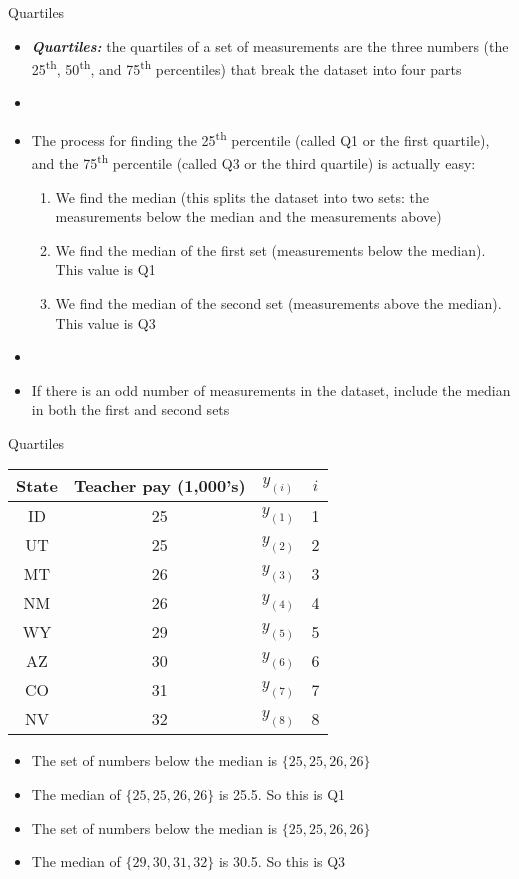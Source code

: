 \documentclass[xcolor=dvipsnames]{beamer}
\begin{document}
\begin{frame}{Quartiles}
	\begin{itemize}
		\item \textbf{\emph{Quartiles:}} the quartiles of a set of measurements are the three numbers (the 25\textsuperscript{th}, 50\textsuperscript{th}, and 75\textsuperscript{th} percentiles) that break the dataset into four parts
			\item[]
		\item The process for finding the 25\textsuperscript{th} percentile (called Q1 or the first quartile), and the 75\textsuperscript{th} percentile (called Q3 or the third quartile) is actually easy:
			\begin{enumerate}
			\item We find the median (this splits the dataset into two sets: the measurements below the median and the measurements above)
			\item We find the median of the first set (measurements below the median). This value is Q1
			\item We find the median of the second set (measurements above the median). This value is Q3
		\end{enumerate}
	\item[]
	\item If there is an odd number of measurements in the dataset, include the median in both the first and second sets
	\end{itemize}
\end{frame}

\begin{frame}{Quartiles}
	\begin{center}
		\begin{tabular}{|c|c|c|c|}
			\hline 
			\textbf{State} & \textbf{Teacher pay (1,000's)} & $y_{(i)}$ & $i$ \\ 
			\hline \hline 
			ID & 25 & $y_{(1)}$& 1 \\  \hline 
			UT &  25  & $y_{(2)}$& 2\\ \hline 
			MT &  26  & $y_{(3)}$& 3\\ \hline 
			NM &  26  & $y_{(4)}$& 4\\ \hline 
			WY &  29  & $y_{(5)}$& 5\\ \hline 
			AZ & 30  & $y_{(6)}$& 6\\ \hline 
			CO &  31 & $y_{(7)}$& 7\\ \hline
			NV & 32  & $y_{(8)}$& 8\\ \hline 
		\end{tabular} 
	\end{center}
\begin{itemize}
	\item The set of numbers below the median is $\{25, 25, 26, 26\}$
	\item The median of $\{25, 25, 26, 26\}$ is 25.5. So this is Q1
	\item The set of numbers below the median is $\{25, 25, 26, 26\}$
	\item The median of $\{29, 30, 31, 32\}$ is 30.5. So this is Q3
\end{itemize}
\end{frame}
\end{document}
